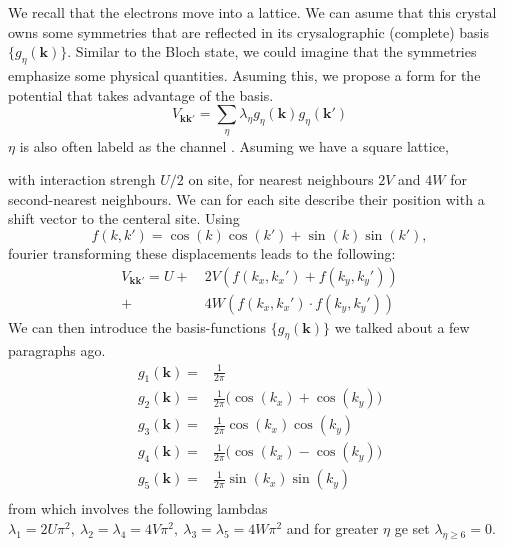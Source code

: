 \documentclass[../main.tex]{subfile}
\begin{document}
We recall that the electrons move into a lattice. We can asume that this crystal owns some symmetries that are reflected in its crysalographic (complete) basis $\{g_{\eta}(\bm{k})\}$.
Similar to the Bloch state, we could imagine that the symmetries emphasize some physical quantities. Asuming this, we propose a form for the potential that takes advantage
of the basis.
\[
    V_{\bm{k}\bm{k}'} = \sum_{\eta} \lambda_{\eta} g_{\eta}(\bm{k})g_{\eta}(\bm{k}')
\]
$\eta$ is also often labeld as the channel \cite{FossheimSudbo2004}. Asuming we have a square lattice, 
\begin{figure}[H]
    \centering
\end{figure}
with interaction strengh $U/2$ on site, for nearest neighbours $2V$ and $4W$ for second-nearest neighbours. We can for each site describe their position with a shift vector 
to the centeral site. Using
\[
    f(k,k')=\cos(k)\cos(k')+\sin(k)\sin(k'),
\]
fourier transforming these displacements leads to the following:
\[
\begin{aligned}
    V_{\bm{k}\bm{k}'} = U + &~2V\left(f(k_x,k_x')+ f(k_y,k_y')\right)\\
    + &~4W \left(f(k_x,k_x') \cdot f(k_y,k_y')\right)
\end{aligned} 
\]
We can then introduce the basis-functions $\{g_{\eta}(\bm{k})\}$ we talked about a few paragraphs ago.
\begin{align*}
    g_{1}(\bm{k}) =& \frac{1}{2\pi}\\
    g_{2}(\bm{k}) =& \frac{1}{2\pi}\bigl( \cos(k_x) + \cos(k_y)\bigr) \tag{s-wave}\\
    g_{3}(\bm{k}) =& \frac{1}{2\pi}\cos(k_x) \cos(k_y)\\
    g_{4}(\bm{k}) =& \frac{1}{2\pi}\bigl( \cos(k_x) - \cos(k_y)\bigr) \tag{d-wave}\\
    g_{5}(\bm{k}) =& \frac{1}{2\pi}\sin(k_x) \sin(k_y)\\
\end{align*}
from which involves the following lambdas $\lambda_1 = 2U\pi^2, ~ \lambda_2=\lambda_4 = 4V\pi^2, ~ \lambda_3=\lambda_5=4W \pi^2$ and for greater
$\eta$ ge set $\lambda_{\eta\ge6} =0$.\\
\end{document}
